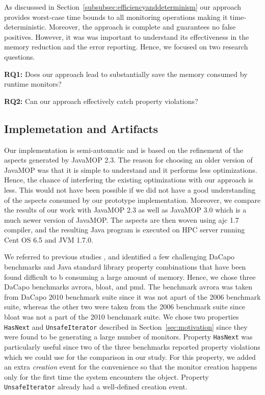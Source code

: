 As discusssed in Section~\ref{subsubsec:efficiencyanddeterminism} our approach 
provides worst-case time bounds to all monitoring operations making it 
time-deterministic. Moreover, the approach is complete and guarantees no false 
positives. However, it was was important to understand its effectiveness in the 
memory reduction and the error reporting. Hence, we focused on two research 
questions.

{\bf RQ1:} Does our approach lead to substantially save the memory consumed by 
runtime monitors?

{\bf RQ2:} Can our approach effectively catch property violations?

\subsection{Implemetation and Artifacts}
\label{subsec:implementation}

Our implementation is semi-automatic and is based on the refinement of the 
aspects generated by JavaMOP 2.3. The reason for choosing an older version of 
JavaMOP was that it is simple to understand and it performs less optimizations. 
Hence, the chance of interfering the existing optimizations with our approach is 
less. This would not have been possible if we did not have a good understanding 
of the aspects consumed by our prototype implementation. Moreover, we compare 
the results of our work with JavaMOP 2.3 as well as JavaMOP 3.0 which is a much 
newer version of JavaMOP. The aspects are then woven using ajc 1.7 compiler, and 
the resulting Java program is executed on HPC server running Cent OS 6.5 and JVM 
1.7.0. 

We referred to previous studies \cite{}, and identified a few challenging DaCapo 
benchmarks and Java standard library property combinations that have been found 
difficult to b consuming a large amount of memory. Hence, we chose three DaCapo 
benchmarks \textsf{avrora}, \textsf{bloat}, and \textsf{pmd}. The benchmark 
\textsf{avrora} was taken from DaCapo 2010 benchmark suite since it was not 
apart of the 2006 benchmark suite, whereas the other two were taken from the 
2006 benchmark suite since \textsf{bloat} was not a part of the 2010 benchmark 
suite. We chose two properties \texttt{HasNext} and \texttt{UnsafeIterator} 
described in Section~\ref{sec:motivation} since they were found to be generating 
a large number of monitors. Property \texttt{HasNext} was particularly useful 
since two of the three benchmarks reported property violations which we could 
use for the comparison in our study. For this property, we added an extra 
\textit{creation} event for the convenience so that the monitor creation happens 
only  for the first time the system encounters the object. Property 
\texttt{UnsafeIterator} already had a well-defined creation event.


